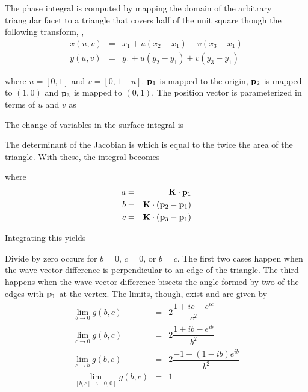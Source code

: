The phase integral is computed by mapping the domain of the arbitrary triangular facet to a triangle that covers half of the unit square though the following transform, \cite{triangleint},
\begin{eqnarray}
x(u,v) &=& x_1 + u(x_2 - x_1) + v(x_3 - x_1) \\
y(u,v) &=& y_1 + u(y_2 - y_1) + v(y_3 - y_1)  
\end{eqnarray}

\noindent where $u = [0,1]$ and $v = [0,1-u]$.  $\mathbf{p}_1$ is mapped to the origin, $\mathbf{p}_2$ is mapped to $(1,0)$ and $\mathbf{p}_3$ is mapped to $(0,1)$. The position vector is parameterized in terms of $u$ and $v$ as 

The change of variables in the surface integral is

The determinant of the Jacobian is
which is equal to the twice the area of the triangle.  With these, the integral becomes 

\noindent where 
\begin{eqnarray}
a &= & \mathbf{K} \cdot \mathbf{p}_1 \\ 
b &=& \mathbf{K} \cdot (\mathbf{p}_2 - \mathbf{p}_1)\\
c &=& \mathbf{K} \cdot (\mathbf{p}_3 - \mathbf{p}_1) 
\end{eqnarray}

Integrating this yields 

Divide by zero occurs for $b = 0$, $c = 0$, or $b = c$. The first two cases happen when the wave vector difference is perpendicular to an edge of the triangle. The third happens when the wave vector difference bisects the angle formed by two of the edges with $\mathbf{p}_1$ at the vertex.  The limits, though, exist and are given by 
\begin{eqnarray}
\lim_{b \rightarrow 0} g(b,c) &=& 2 \dfrac{1 + ic - e^{ic} }{c^2} \\
\lim_{c \rightarrow 0} g(b,c) &=& 2 \dfrac{1 + ib -e^{ib}}{b^2} \\
\lim_{c \rightarrow b} g(b,c) &=& 2 \dfrac{-1 +(1-ib) e^{ib}}{b^2} \\
\lim_{[b,c] \rightarrow [0,0]}g(b,c) &=& 1
\end{eqnarray}

